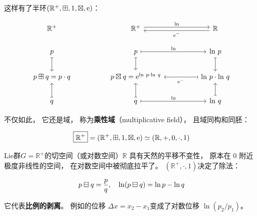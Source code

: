 ﻿\documentclass[10pt,a4paper]{article}
\numberwithin{equation}{section}
\begin{document}
这样有了半环$(\mathbb R^+,\mathbin{\boxplus},1,\mathbin{\boxtimes},\text e)$：

$$
\begin{tikzcd}
\mathbb R^+             &  & \mathbb R^+ \arrow[rr, "\text{ln}", shift left]               &  & \mathbb R \arrow[ll, "\text e^-", shift left]                          \\
p \arrow[d, maps to]    &  & p \arrow[rr, "\text{ln}", maps to] \arrow[d, maps to]         &  & \text{ln} \ p \arrow[d, maps to]                                       \\
p \sqplus q = p \cdot q &  & p \sqtimes q =\text e^{\text{ln} \ p \cdot \text{ln} \ q} &  & \text{ln} \ p \cdot \text{ln} \ q \arrow[ll, "\text e^-", maps to] \\
q \arrow[u, maps to]    &  & q \arrow[rr, "\text{ln}", maps to] \arrow[u, maps to]         &  & \text{ln} \ q \arrow[u, maps to]                                      
\end{tikzcd}
$$

不仅如此，
它还是域，
称为\textbf{乘性域}（multiplicative field），
且域同构和同胚：

\begin{equation}
\boxed{\mathbb R^+} = (\mathbb R^+,\mathbin{\boxplus},1,\mathbin{\boxtimes},\text e)
\simeq
(\mathbb R,+,0,\cdot,1)
\label{eq:Multiplicative-Field}
\end{equation}

Lie群$G = \mathbb R^+$的切空间（或对数空间）$\mathbb R$ 具有天然的平移不变性，
原本在 $0$ 附近极度非线性的空间，
在对数空间中被彻底拉平了。
$(\mathbb R^+,\cdot,1)$决定了除法：

\begin{equation*}
p \mathbin{\boxminus} q = \frac{p}{q},\quad
\ln(p \mathbin{\boxminus} q) = \ln p - \ln q
\end{equation*}

它代表\textbf{比例的剥离}。
例如的位移 $\Delta x = x_2 - x_1$变成了对数位移 $\ln(p_2 / p_1)$。
\end{document}
